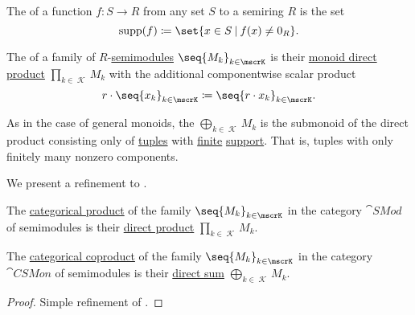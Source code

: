 \begin{definition}\label{def:function_support}
  The  of a function \( f: S \to R \) from any set \( S \) to a semiring \( R \) is the set
  \begin{equation*}
    \supp(f) \coloneqq \set{ x \in S \given f(x) \neq 0_R }.
  \end{equation*}
\end{definition}

\begin{definition}\label{def:semimodule_direct_product}
  The  of a family of \( R \)-\hyperref[def:semimodule]{semimodules} \( \seq{ M_k }_{k \in \mscrK} \) is their \hyperref[def:monoid_direct_product]{monoid direct product} \( \prod_{k \in \mscrK} M_k \) with the additional componentwise scalar product
  \begin{equation*}
    r \cdot \seq{ x_k }_{k \in \mscrK}
    \coloneqq
    \seq{ r \cdot x_k }_{k \in \mscrK}.
  \end{equation*}

  As in the case of general monoids, the  \( \bigoplus_{k \in \mscrK} M_k \) is the submonoid of the direct product consisting only of \hyperref[def:cartesian_product/tuple]{tuples} with \hyperref[def:set_finiteness]{finite} \hyperref[def:function_support]{support}. That is, tuples with only finitely many nonzero components.
\end{definition}

\begin{proposition}\label{thm:semimodule_categorical_limits}
  We present a refinement to .

  \begin{thmenum}
     The \hyperref[def:discrete_category_limits]{categorical product} of the family \( \seq{ M_k }_{k \in \mscrK} \) in the category \hyperref[def:semimodule/category]{\( \cat{SMod} \)} of semimodules is their \hyperref[def:semimodule_direct_product]{direct product} \( \prod_{k \in \mscrK} M_k \).

     The \hyperref[def:discrete_category_limits]{categorical coproduct} of the family \( \seq{ M_k }_{k \in \mscrK} \) in the category \hyperref[def:semimodule/category]{\( \cat{CSMon} \)} of  semimodules is their \hyperref[def:semimodule_direct_product]{direct sum} \( \bigoplus_{k \in \mscrK} M_k \).
  \end{thmenum}
\end{proposition}
\begin{proof}
  Simple refinement of .
\end{proof}

